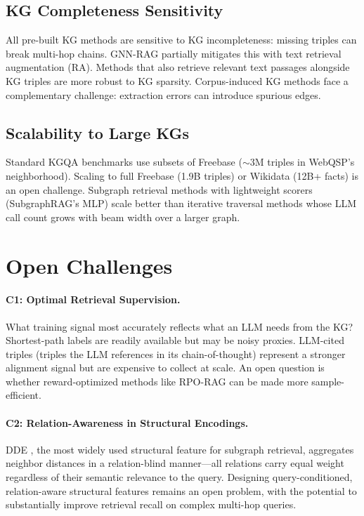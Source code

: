 \documentclass[11pt]{article}
\begin{document}
\subsection{KG Completeness Sensitivity}

All pre-built KG methods are sensitive to KG incompleteness: missing triples can break multi-hop chains. GNN-RAG partially mitigates this with text retrieval augmentation (RA). Methods that also retrieve relevant text passages alongside KG triples are more robust to KG sparsity. Corpus-induced KG methods face a complementary challenge: extraction errors can introduce spurious edges.

\subsection{Scalability to Large KGs}

Standard KGQA benchmarks use subsets of Freebase ($\sim$3M triples in WebQSP's neighborhood). Scaling to full Freebase (1.9B triples) or Wikidata (12B+ facts) is an open challenge. Subgraph retrieval methods with lightweight scorers (SubgraphRAG's MLP) scale better than iterative traversal methods whose LLM call count grows with beam width over a larger graph.

\section{Open Challenges}
\label{sec:challenges}

\paragraph{C1: Optimal Retrieval Supervision.}
What training signal most accurately reflects what an LLM needs from the KG? Shortest-path labels are readily available but may be noisy proxies. LLM-cited triples (triples the LLM references in its chain-of-thought) represent a stronger alignment signal but are expensive to collect at scale. An open question is whether reward-optimized methods like RPO-RAG can be made more sample-efficient.

\paragraph{C2: Relation-Awareness in Structural Encodings.}
DDE \cite{wang2025subgraphrag}, the most widely used structural feature for subgraph retrieval, aggregates neighbor distances in a relation-blind manner—all relations carry equal weight regardless of their semantic relevance to the query. Designing query-conditioned, relation-aware structural features remains an open problem, with the potential to substantially improve retrieval recall on complex multi-hop queries.
\end{document}
